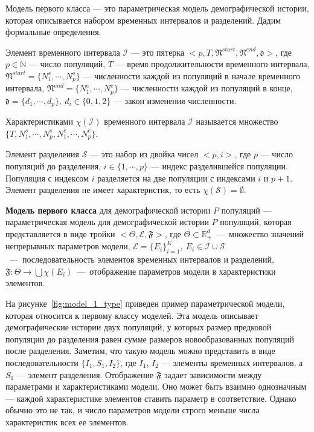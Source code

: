 \documentclass[a4paper,14pt,oneside,openany,article]{memoir}
\begin{document}
Модель первого класса --- это параметрическая модель демографической истории, которая описывается набором временных интервалов и разделений.
Дадим формальные определения.

 Элемент временного интервала $\mathcal{I}$ --- это пятерка $<p, T, \mathfrak{N}^{start}, \mathfrak{N}^{end}, \mathfrak{d}>$, где $p \in \mathbb{N}$ --- число популяций, $T$ --- время продолжительности временного интервала, $\mathfrak{N}^{start} = \{N^s_1, \cdots,N^s_p\}$ --- численности каждой из популяций в начале временного интервала, $\mathfrak{N}^{end} = \{N^e_1, \cdots,N^e_p\}$ --- численности каждой из популяций в конце, $\mathfrak{d} = \{d_1, \cdots,d_p\},\ d_i \in \{0, 1, 2\}$ --- закон изменения численности.

 Характеристиками $\chi(\mathcal{I})$ временного интервала $\mathcal{I}$ называется множество
$\{T, N^s_1, \cdots,N^s_p, N^e_1, \cdots,N^e_p\}$.

 Элемент разделения $\mathcal{S}$ --- это набор из двойка чисел $<p, i>$, где $p$ --- число популяций до разделения, $i \in \{1, \cdots, p\}$ --- индекс разделившейся популяции.
Популяция с индексом $i$ разделяется на две популяции с индексами $i$ и $p+1$.
Элемент разделения не имеет характеристик, то есть $\chi(\mathcal{S}) = \emptyset$.

 \textbf{Модель первого класса} для демографической истории $P$ популяций --- параметрическая модель для демографической истории $P$ популяций, которая представляется в виде тройки $<\Theta, \mathcal{E}, \mathfrak{F}>$, где $\Theta \subset \mathbb{R}_+^d$~---~множество значений непрерывных параметров модели, $\mathcal{E} = \{E_i\}_{i=1}^K,\ E_i \in \mathcal{I} \cup \mathcal{S}$~---~последовательность элементов временных интервалов и разделений, $\mathfrak{F}: \Theta \to  \bigcup \chi(E_i)$~---~отображение параметров модели в характеристики элементов.

На рисунке~\ref{fig:model_1_type} приведен пример параметрической модели, которая относится к первому классу моделей.
Эта модель описывает демографические истории двух популяций, у которых размер предковой популяции до разделения равен сумме размеров новообразованных популяций после разделения.
Заметим, что такую модель можно представить в виде последовательности $\{I_1, S_1, I_2\}$, где $I_1$, $I_2$ --- элементы временных интервалов, а $S_1$ --- элемент разделения.
Отображение $\mathfrak{F}$ задает зависимости между параметрами и характеристиками модели.
Оно может быть взаимно однозначным --- каждой характеристике элементов ставить параметр в соответствие.
Однако обычно это не так, и число параметров модели строго меньше числа характеристик всех ее элементов.
\end{document}

